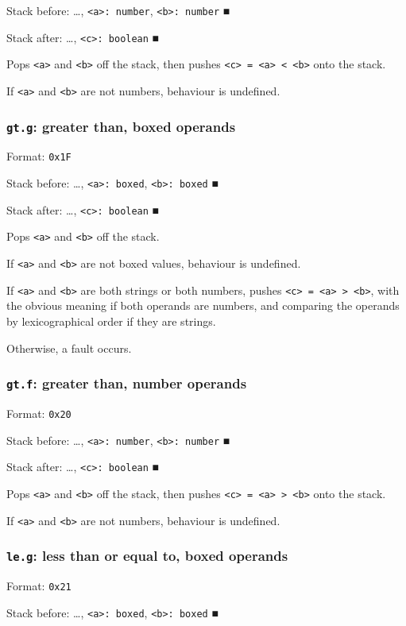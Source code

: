 Stack before: \ldots{}​, \texttt{<a>: number}, \texttt{<b>: number} ■

Stack after: \ldots{}​, \texttt{<c>: boolean} ■

Pops \texttt{<a>} and \texttt{<b>} off the stack, then pushes \texttt{<c> = <a> < <b>} onto
the stack.

If \texttt{<a>} and \texttt{<b>} are not numbers, behaviour is undefined.

\subsubsection{\texttt{gt.g}: greater than, boxed operands}
\label{sec:orge89bbc6}
Format: \texttt{0x1F}

Stack before: \ldots{}​, \texttt{<a>: boxed}, \texttt{<b>: boxed} ■

Stack after: \ldots{}​, \texttt{<c>: boolean} ■

Pops \texttt{<a>} and \texttt{<b>} off the stack.

If \texttt{<a>} and \texttt{<b>} are not boxed values, behaviour is undefined.

If \texttt{<a>} and \texttt{<b>} are both strings or both numbers, pushes
\texttt{<c> = <a> > <b>}, with the obvious meaning if both operands are
numbers, and comparing the operands by lexicographical order if they are
strings.

Otherwise, a fault occurs.

\subsubsection{\texttt{gt.f}: greater than, number operands}
\label{sec:org3ea3931}
Format: \texttt{0x20}

Stack before: \ldots{}​, \texttt{<a>: number}, \texttt{<b>: number} ■

Stack after: \ldots{}​, \texttt{<c>: boolean} ■

Pops \texttt{<a>} and \texttt{<b>} off the stack, then pushes \texttt{<c> = <a> > <b>} onto
the stack.

If \texttt{<a>} and \texttt{<b>} are not numbers, behaviour is undefined.

\subsubsection{\texttt{le.g}: less than or equal to, boxed operands}
\label{sec:orgf9e2550}
Format: \texttt{0x21}

Stack before: \ldots{}​, \texttt{<a>: boxed}, \texttt{<b>: boxed} ■

